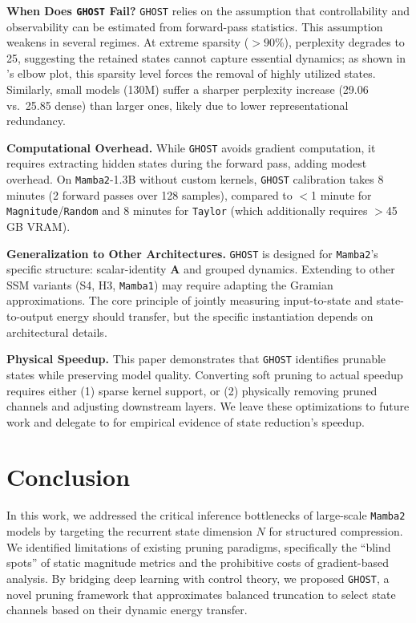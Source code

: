 \documentclass{article}
\theoremstyle{plain}
\theoremstyle{definition}
\theoremstyle{remark}
\begin{document}
\textbf{When Does \texttt{GHOST} Fail?}
\texttt{GHOST} relies on the assumption that controllability and observability can be estimated from forward-pass statistics. This assumption weakens in several regimes.
At extreme sparsity ($>90\%$), perplexity degrades to 25, suggesting the retained states cannot capture essential dynamics; as shown in  's elbow plot, this sparsity level forces the removal of highly utilized states. Similarly, small models (130M) suffer a sharper perplexity increase (29.06 vs.\ 25.85 dense) than larger ones, likely due to lower representational redundancy.

\textbf{Computational Overhead.}
While \texttt{GHOST} avoids gradient computation, it requires extracting hidden states during the forward pass, adding modest overhead. On \texttt{Mamba2}-1.3B without custom kernels, \texttt{GHOST} calibration takes 8 minutes (2 forward passes over 128 samples), compared to $<$1 minute for \texttt{Magnitude}/\texttt{Random} and 8 minutes for \texttt{Taylor} (which additionally requires $>$45\,GB VRAM).

\textbf{Generalization to Other Architectures.}
\texttt{GHOST} is designed for \texttt{Mamba2}'s specific structure: scalar-identity $\bm{A}$ and grouped dynamics. Extending to other SSM variants (S4, H3, \texttt{Mamba1}) may require adapting the Gramian approximations. The core principle of jointly measuring input-to-state and state-to-output energy should transfer, but the specific instantiation depends on architectural details.

\textbf{Physical Speedup.}
This paper demonstrates that \texttt{GHOST} identifies prunable states while preserving model quality. Converting soft pruning to actual speedup requires either (1) sparse kernel support, or (2) physically removing pruned channels and adjusting downstream layers. We leave these optimizations to future work and delegate to \cite{asif_perfmamba_2025} for empirical evidence of state reduction's speedup.


\section{Conclusion}

In this work, we addressed the critical inference bottlenecks of large-scale \texttt{Mamba2} models by targeting the recurrent state dimension $N$ for structured compression. We identified limitations of existing pruning paradigms, specifically the ``blind spots'' of static magnitude metrics and the prohibitive costs of gradient-based analysis. By bridging deep learning with control theory, we proposed \texttt{GHOST}, a novel pruning framework that approximates balanced truncation to select state channels based on their dynamic energy transfer.
\end{document}
